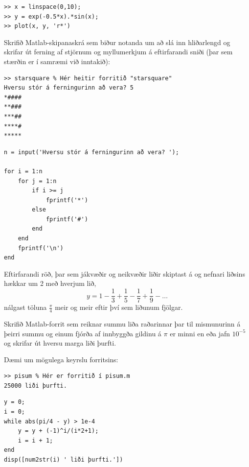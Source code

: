 \documentclass[addpoints]{exam}
\begin{document}
\begin{questions}
\vspace{5cm}

\begin{solution}
 
\begin{verbatim}
>> x = linspace(0,10);
>> y = exp(-0.5*x).*sin(x);
>> plot(x, y, 'r*')
\end{verbatim}

\end{solution}

\newpage
\question[10] Skrifið Matlab-skipanaskrá sem biður notanda um að slá inn hliðarlengd og skrifar út ferning af stjörnum og myllumerkjum á eftirfarandi sniði (þar sem stærðin er í samræmi við inntakið):
\begin{verbatim}
>> starsquare % Hér heitir forritið "starsquare"
Hversu stór á ferningurinn að vera? 5
*####
**###
***##
****#
*****    
\end{verbatim}

\begin{solution}
\begin{verbatim}
n = input('Hversu stór á ferningurinn að vera? ');

for i = 1:n
    for j = 1:n
        if i >= j
            fprintf('*')
        else
            fprintf('#')
        end
    end
    fprintf('\n')
end
\end{verbatim}
\end{solution}

\newpage
\question[10] Eftirfarandi röð, þar sem jákvæðir og neikvæðir liðir skiptast á og nefnari liðsins hækkar um 2 með hverjum lið,  \[y = 1 - \frac{1}{3} + \frac{1}{5} - \frac{1}{7} + \frac{1}{9}- \ldots\] nálgast töluna $\frac{\pi}{4}$ meir og meir eftir því sem liðunum fjölgar.

Skrifið Matlab-forrit sem reiknar summu liða raðarinnar þar til mismunurinn á þeirri summu og einum fjórða af innbyggða gildinu á $\pi$ er minni en eða jafn $10^{-5}$ og skrifar út hversu marga liði þurfti.

Dæmi um mögulega keyrslu forritsins:

\begin{verbatim}
>> pisum % Hér er forritið í pisum.m
25000 liði þurfti.
\end{verbatim}

\begin{solution}

\begin{verbatim}
y = 0;
i = 0;
while abs(pi/4 - y) > 1e-4
    y = y + (-1)^i/(i*2+1);
    i = i + 1;
end
disp([num2str(i) ' liði þurfti.'])
\end{verbatim}


\end{solution}
\end{questions}
\end{document}
